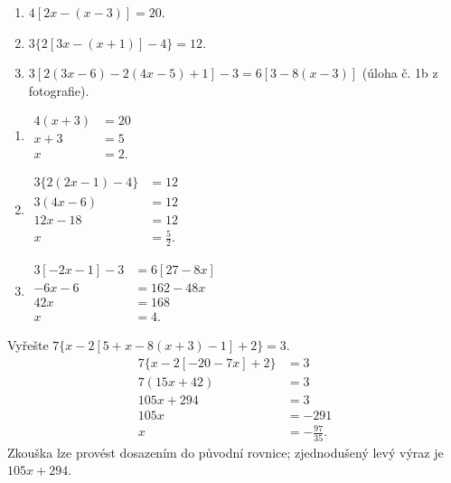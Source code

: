 \documentclass[11pt,a4paper]{article}
\begin{document}
\begin{zadaniReseniBox}
\begin{enumerate}[label=\alph*)]
\item $4[2x-(x-3)]=20$.
\item $3\{2[3x-(x+1)]-4\}=12$.
\item $3[2(3x-6)-2(4x-5)+1]-3=6[3-8(x-3)]$ (úloha č. 1b z fotografie).
\end{enumerate}
\tcblower
\begin{enumerate}[label=\alph*)]
\item \(\begin{aligned}4(x+3)&=20\\x+3&=5\\x&=2.\end{aligned}\)
\item \(\begin{aligned}3\{2(2x-1)-4\}&=12\\3(4x-6)&=12\\12x-18&=12\\x&=\tfrac52.\end{aligned}\)
\item \(\begin{aligned}3[-2x-1]-3&=6[27-8x]\\-6x-6&=162-48x\\42x&=168\\x&=4.\end{aligned}\)
\end{enumerate}
\end{zadaniReseniBox}
\begin{zadaniReseniBox}
Vyřešte $7\{x-2[5+x-8(x+3)-1]+2\}=3$.
\tcblower
\begin{align*}
7\{x-2[-20-7x]+2\}&=3\\
7(15x+42)&=3\\
105x+294&=3\\
105x&=-291\\
x&=-\frac{97}{35}.
\end{align*}
Zkouška lze provést dosazením do původní rovnice; zjednodušený levý výraz je $105x+294$.
\end{zadaniReseniBox}
\end{document}

